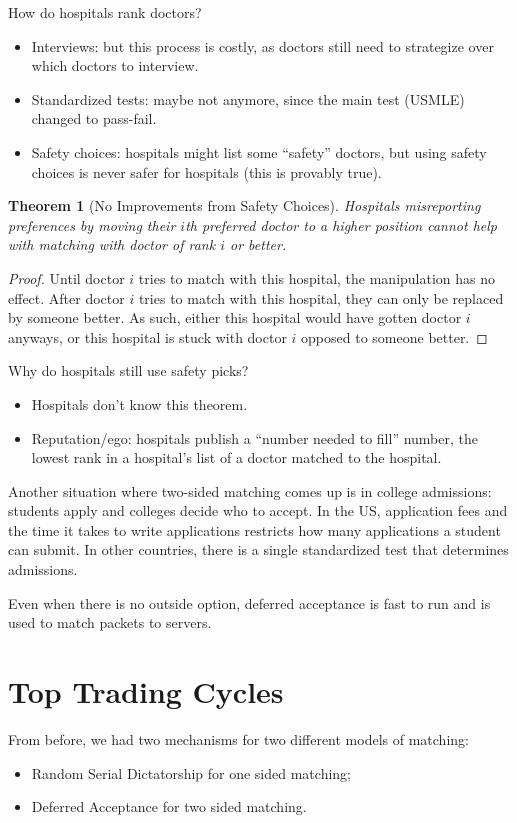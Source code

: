 \documentclass[dvipsnames]{article}
\newtheorem{theorem}{Theorem}[section]
\theoremstyle{definition}
\theoremstyle{remark}
\begin{document}
How do hospitals rank doctors?
\begin{itemize}
	\item Interviews: but this process is costly, as doctors still need to strategize over which doctors to interview.
	\item Standardized tests: maybe not anymore, since the main test (USMLE) changed to pass-fail.
	\item Safety choices: hospitals might list some ``safety'' doctors, but using safety choices is never safer for hospitals (this is provably true).
\end{itemize}

\begin{theorem}[No Improvements from Safety Choices]
	Hospitals misreporting preferences by moving their $i$th preferred doctor to a higher position cannot help with matching with doctor of rank $i$ or better.
\end{theorem}

\begin{proof}
	Until doctor $i$ tries to match with this hospital, the manipulation has no effect. After doctor $i$ tries to match with this hospital, they can only be replaced by someone better. As such, either this hospital would have gotten doctor $i$ anyways, or this hospital is stuck with doctor $i$ opposed to someone better.
\end{proof}

Why do hospitals still use safety picks?
\begin{itemize}
	\item Hospitals don't know this theorem.
	\item Reputation/ego: hospitals publish a ``number needed to fill'' number, the lowest rank in a hospital's list of a doctor matched to the hospital.
\end{itemize}

Another situation where two-sided matching comes up is in college admissions: students apply and colleges decide who to accept. 
In the US, application fees and the time it takes to write applications restricts how many applications a student can submit.
In other countries, there is a single standardized test that determines admissions.

Even when there is no outside option, deferred acceptance is fast to run and is used to match packets to servers.	

\newpage

\section{Top Trading Cycles}
From before, we had two mechanisms for two different models of matching:
\begin{itemize}
	\item Random Serial Dictatorship for one sided matching;
	\item Deferred Acceptance for two sided matching.
\end{itemize}
\end{document}
